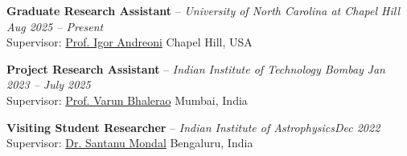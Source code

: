\textbf{Graduate Research Assistant} -- \textit{University of North Carolina at Chapel Hill}
\hfill \textit{Aug 2025 -- Present} \\
Supervisor: \href{https://www.igorandreoni.com/}{Prof. Igor Andreoni} \hfill  Chapel Hill, USA

\vspace{0.5em}

\textbf{Project Research Assistant} -- \textit{Indian Institute of Technology Bombay}
\hfill \textit{Jan 2023 -- July 2025} \\
Supervisor: \href{https://www.phy.iitb.ac.in/en/content/prof-varun-bhalerao}{Prof. Varun Bhalerao} \hfill  Mumbai, India


\vspace{0.5em}

\textbf{Visiting Student Researcher} -- \textit{Indian Institute of Astrophysics}\hfill \textit{Dec 2022} \\
Supervisor: \href{https://santanumondal.wixsite.com/horizon}{Dr. Santanu Mondal} \hfill Bengaluru, India
